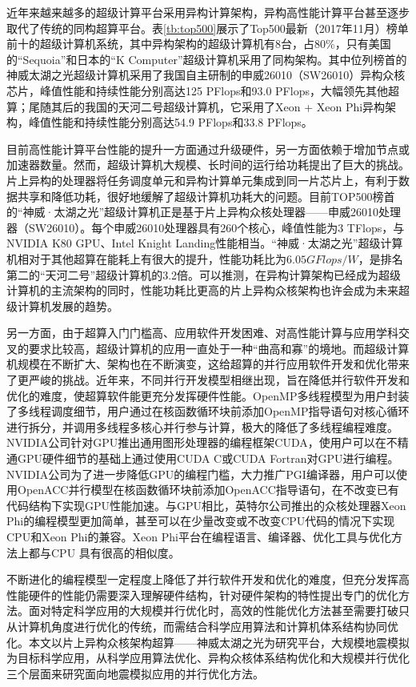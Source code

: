 近年来越来越多的超级计算平台采用异构计算架构\cite{buyya1999high}，异构高性能计算平台甚至逐步取代了传统的同构超算平台。表\ref{tb:top500}展示了Top500最新（2017年11月）榜单前十的超级计算机系统，其中异构架构的超级计算机有8台，占80\%，只有美国的“Sequoia”和日本的“K Computer”超级计算机采用了同构架构。其中位列榜首的神威太湖之光超级计算机采用了我国自主研制的申威26010（SW26010）异构众核芯片，峰值性能和持续性能分别高达125 PFlops和93.0 PFlops，大幅领先其他超算；尾随其后的我国的天河二号超级计算机，它采用了Xeon + Xeon Phi异构架构，峰值性能和持续性能分别高达54.9 PFlops和33.8 PFlops。

目前高性能计算平台性能的提升一方面通过升级硬件，另一方面依赖于增加节点或加速器数量。然而，超级计算机大规模、长时间的运行给功耗提出了巨大的挑战\cite{reed2015exascale}。片上异构的处理器将任务调度单元和异构计算单元集成到同一片芯片上，有利于数据共享和降低功耗，很好地缓解了超级计算机功耗大的问题。目前TOP500榜首的“神威·太湖之光”超级计算机正是基于片上异构众核处理器\cite{fu2016sunway}——申威26010处理器（SW26010）。每个申威26010处理器具有260个核心，峰值性能为3 TFlops，与NVIDIA K80 GPU、Intel Knight Landing性能相当\cite{einkemmer2017evaluation,sodani2016knights}。“神威·太湖之光”超级计算机相对于其他超算在能耗上有很大的提升，性能功耗比为$6.05GFlops/W$，是排名第二的“天河二号”超级计算机的3.2倍。可以推测，在异构计算架构已经成为超级计算机的主流架构的同时，性能功耗比更高的片上异构众核架构也许会成为未来超级计算机发展的趋势。

另一方面，由于超算入门门槛高、应用软件开发困难、对高性能计算与应用学科交叉的要求比较高，超级计算机的应用一直处于一种“曲高和寡”的境地。而超级计算机规模在不断扩大、架构也在不断演变，这给超算的并行应用软件开发和优化带来了更严峻的挑战。近年来，不同并行开发模型相继出现，旨在降低并行软件开发和优化的难度，使超算软件能更充分发挥硬件性能。OpenMP多线程模型为用户封装了多线程调度细节，用户通过在核函数循环块前添加OpenMP指导语句对核心循环进行拆分，并调用多线程多核心并行参与计算，极大的降低了多线程编程难度。NVIDIA公司针对GPU推出通用图形处理器的编程框架CUDA\cite{cook2012cuda}，使用户可以在不精通GPU硬件细节的基础上通过使用CUDA C或CUDA Fortran对GPU进行编程。NVIDIA公司为了进一步降低GPU的编程门槛，大力推广PGI编译器，用户可以使用OpenACC并行模型在核函数循环块前添加OpenACC指导语句，在不改变已有代码结构下实现GPU性能加速。与GPU相比，英特尔公司推出的众核处理器Xeon Phi的编程模型更加简单，甚至可以在少量改变或不改变CPU代码的情况下实现CPU和Xeon Phi的兼容。Xeon Phi平台在编程语言、编译器、优化工具与优化方法上都与CPU 具有很高的相似度。

不断进化的编程模型一定程度上降低了并行软件开发和优化的难度，但充分发挥高性能硬件的性能仍需要深入理解硬件结构，针对硬件架构的特性提出专门的优化方法。面对特定科学应用的大规模并行优化时，高效的性能优化方法甚至需要打破只从计算机角度进行优化的传统，而需结合科学应用算法和计算机体系结构协同优化。本文以片上异构众核架构超算——神威太湖之光为研究平台，大规模地震模拟为目标科学应用，从科学应用算法优化、异构众核体系结构优化和大规模并行优化三个层面来研究面向地震模拟应用的并行优化方法。

